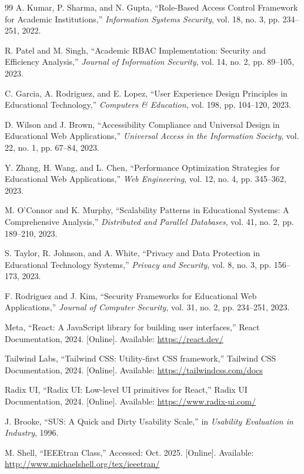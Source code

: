 \documentclass[conference]{IEEEtran}
\begin{document}
\begin{thebibliography}{99}
A. Kumar, P. Sharma, and N. Gupta, ``Role-Based Access Control Framework for Academic Institutions,'' \emph{Information Systems Security}, vol. 18, no. 3, pp. 234--251, 2022.

R. Patel and M. Singh, ``Academic RBAC Implementation: Security and Efficiency Analysis,'' \emph{Journal of Information Security}, vol. 14, no. 2, pp. 89--105, 2023.

C. Garcia, A. Rodriguez, and E. Lopez, ``User Experience Design Principles in Educational Technology,'' \emph{Computers \& Education}, vol. 198, pp. 104--120, 2023.

D. Wilson and J. Brown, ``Accessibility Compliance and Universal Design in Educational Web Applications,'' \emph{Universal Access in the Information Society}, vol. 22, no. 1, pp. 67--84, 2023.

Y. Zhang, H. Wang, and L. Chen, ``Performance Optimization Strategies for Educational Web Applications,'' \emph{Web Engineering}, vol. 12, no. 4, pp. 345--362, 2023.

M. O'Connor and K. Murphy, ``Scalability Patterns in Educational Systems: A Comprehensive Analysis,'' \emph{Distributed and Parallel Databases}, vol. 41, no. 2, pp. 189--210, 2023.

S. Taylor, R. Johnson, and A. White, ``Privacy and Data Protection in Educational Technology Systems,'' \emph{Privacy and Security}, vol. 8, no. 3, pp. 156--173, 2023.

F. Rodriguez and J. Kim, ``Security Frameworks for Educational Web Applications,'' \emph{Journal of Computer Security}, vol. 31, no. 2, pp. 234--251, 2023.

Meta, ``React: A JavaScript library for building user interfaces,'' React Documentation, 2024. [Online]. Available: \url{https://react.dev/}

Tailwind Labs, ``Tailwind CSS: Utility-first CSS framework,'' Tailwind CSS Documentation, 2024. [Online]. Available: \url{https://tailwindcss.com/docs}

Radix UI, ``Radix UI: Low-level UI primitives for React,'' Radix UI Documentation, 2024. [Online]. Available: \url{https://www.radix-ui.com/}

J. Brooke, ``SUS: A Quick and Dirty Usability Scale,'' in \emph{Usability Evaluation in Industry}, 1996.

M. Shell, ``IEEEtran Class,'' Accessed: Oct. 2025. [Online]. Available: \url{http://www.michaelshell.org/tex/ieeetran/}

\end{thebibliography}
\end{document}
